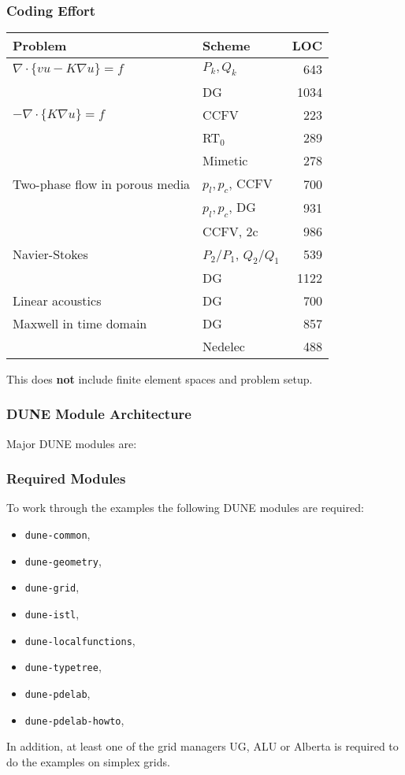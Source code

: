 \begin{frame}
\frametitle<presentation>{Coding Effort}
\begin{center}
\small\begin{tabular}{|p{}|p{}|r|}
\hline
Problem & Scheme & LOC \\
\hline
\hline
$\nabla\cdot\{v u - K\nabla u\}=f$ & $P_k, Q_k$ & 643 \\
 & DG & 1034 \\
\hline
$-\nabla\cdot\{K\nabla u\}=f$ & CCFV & 223 \\
 & RT$_0$ & 289 \\
 & Mimetic & 278 \\
\hline
Two-phase flow in porous media & $p_l, p_c$, CCFV & 700 \\
& $p_l, p_c$, DG & 931 \\
& CCFV, 2c & 986 \\
\hline
Navier-Stokes & $P_2/P_1$, $Q_2/Q_1$ & 539 \\
           & DG & 1122 \\
\hline
Linear acoustics & DG & 700 \\
\hline
Maxwell in time domain & DG & 857 \\
 & Nedelec & 488 \\
\hline
\end{tabular}
\end{center}
This does \textbf{not} include finite element spaces and problem setup.
\end{frame}

\begin{frame}
\frametitle<presentation>{DUNE Module Architecture}
Major DUNE modules are:
\begin{center}
\end{center}
\end{frame}

\begin{frame}
\frametitle<presentation>{Required Modules}
To work through the examples the following DUNE modules are required:
\begin{itemize}
\item \lstinline{dune-common},
\item \lstinline{dune-geometry},
\item \lstinline{dune-grid},
\item \lstinline{dune-istl},
\item \lstinline{dune-localfunctions},
\item \lstinline{dune-typetree},
\item \lstinline{dune-pdelab},
\item \lstinline{dune-pdelab-howto},
\end{itemize}

In addition, at least one of the grid managers UG, ALU or Alberta is
required to do the examples on simplex grids.
\end{frame}




